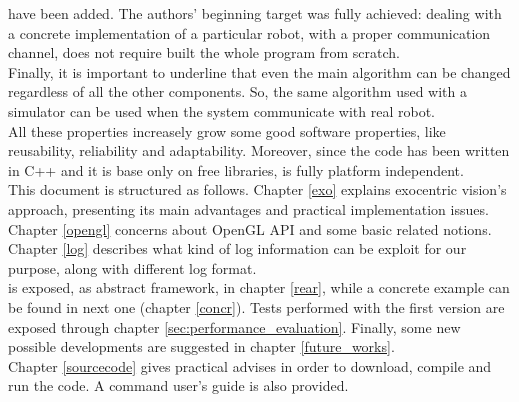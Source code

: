 have been added. The authors' beginning target was fully achieved:
dealing with a concrete implementation of a particular robot, with a
proper communication channel, does not require built the whole
program from scratch.
\\
Finally, it is important to underline that even the main algorithm
can be changed regardless of all the other components. So, the same
algorithm used with a simulator can be used when the system
communicate with real robot.
\\
All these properties increasely grow some good software properties,
like reusability, reliability and adaptability. Moreover,
since the code has been written in C++ and it is base only on
free libraries, \framework{} is fully platform independent.
\\
This document is structured as follows. Chapter \ref{exo} explains
exocentric vision's approach, presenting its main advantages and
practical implementation issues. Chapter \ref{opengl} concerns
about OpenGL API and some basic related notions. Chapter \ref{log}
describes what kind of log information can be exploit for our
purpose, along with different log format.
\\
\framework{} is exposed, as abstract framework, in chapter
\ref{rear}, while a concrete example can be found in next one
(chapter \ref{concr}).
Tests performed with the first \framework{} version are exposed
through chapter \ref{sec:performance_evaluation}. Finally, some new
possible developments are suggested in chapter
\ref{future_works}.
\\
Chapter \ref{sourcecode} gives practical advises
in order to download, compile and run the code. A command user's guide
is also provided.

